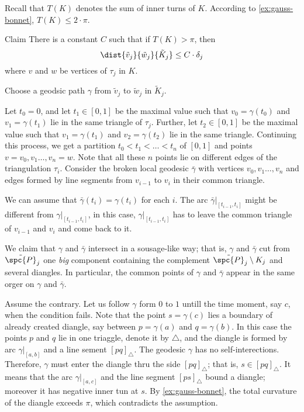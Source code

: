 Recall that $T(K)$ denotes the sum of inner turns of $K$.
According to \ref{ex:gauss-bonnet}, $T(K)\le 2\cdot\pi$.

\begin{thm}{Claim}
There is a constant $C$ such that if $T(K)>\pi$, then
\[\dist{\tilde v_j}{\tilde w_j}{\tilde K_j}\le C\cdot\delta_j\]
where $v$ and $w$ be vertices of $\tau_j$ in $K$.
\end{thm}

Choose a geodsic path $\gamma$ from $\tilde v_j$ to $\tilde w_j$ in $\tilde K_j$.

Let $t_0=0$, and let $t_1\in[0,1]$ be the maximal value such that $v_0=\gamma(t_0)$ and $v_1=\gamma(t_1)$ lie in the same triangle of $\tau_j$.
Further, let $t_2\in[0,1]$ be the maximal value such that $v_1=\gamma(t_1)$ and $v_2=\gamma(t_2)$ lie in the same triangle.
Continuing this process, we get a partition $t_0<t_1<\dots<t_n$ of $[0,1]$ and points $v=v_0,v_1\dots,v_n=w$.
Note that all these $n$ points lie on different edges of the triangulation $\tau_i$.
Consider the broken local geodesic $\bar\gamma$ with vertices $v_0,v_1\dots,v_n$ and edges formed by line segments from $v_{i-1}$ to $v_i$ in their common triangle.

We can assume that $\bar\gamma(t_i)=\gamma(t_i)$ for each $i$.
The arc $\bar\gamma|_{[t_{i-1},t_i]}$ might be different from $\gamma|_{[t_{i-1},t_i]}$,
in this case, $\gamma|_{[t_{i-1},t_i]}$ has to leave the common triangle of $v_{i-1}$ and $v_i$ and come back to it.

We claim that $\gamma$ and $\bar\gamma$ intersect in a sousage-like way;
that is, $\gamma$ and $\bar\gamma$ cut from $\tilde{\spc{P}}_j$ one \textit{big} component containing the complement $\tilde{\spc{P}}_j\setminus K_j$ and several diangles.
In particular, the common points of $\gamma$ and $\bar\gamma$ appear in the same orger on $\gamma$ and $\bar\gamma$.

Assume the contrary.
Let us follow $\gamma$ form $0$ to $1$ untill the time moment, say $c$, when the condition fails.
Note that the point $s=\gamma(c)$ lies a boundary of already created diangle, say between $p=\gamma(a)$ and $q=\gamma(b)$.
In this case the points $p$ and $q$ lie in one triaggle, denote it by $\triangle$, and the diangle is formed by arc $\gamma|_{[a,b]}$ and a line sement $[pq]_\triangle$.
The geodesic $\gamma$ has no self-interections.
Therefore, $\gamma$ must enter the diangle thru the side $[pq]_\triangle$;
that is, $s\in [pq]_\triangle$.
It means that the arc $\gamma|_{[a,c]}$ and the line segment $[ps]_\triangle$ bound a diangle;
moreover it has negative inner tun at $s$.
By \ref{ex:gauss-bonnet}, the total curvature of the diangle exceeds $\pi$, which contradicts the assumption.

